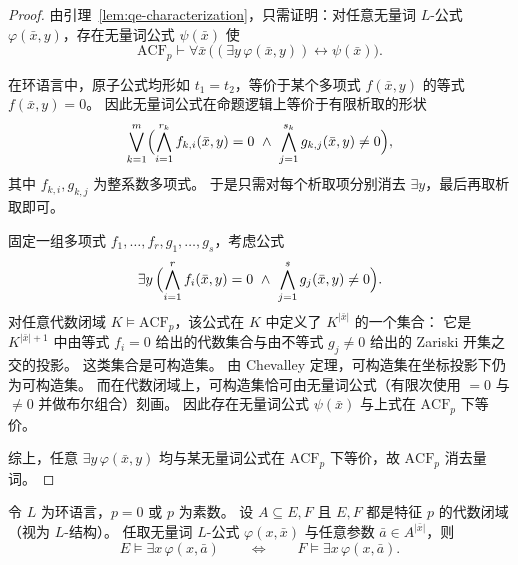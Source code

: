 \documentclass[lang=cn,a4paper,newtx,section]{elegantbook}
\begin{document}
\begin{proof}
由引理~\ref{lem:qe-characterization}，只需证明：对任意无量词 $L$-公式 $\varphi(\bar x,y)$，存在无量词公式 $\psi(\bar x)$ 使
\[
  \mathrm{ACF}_p\vdash\forall\bar x\,\bigl((\exists y\,\varphi(\bar x,y))\leftrightarrow\psi(\bar x)\bigr).
\]

在环语言中，原子公式均形如 $t_1=t_2$，等价于某个多项式 $f(\bar x,y)$ 的等式 $f(\bar x,y)=0$。
因此无量词公式在命题逻辑上等价于有限析取的形状
\[
  \bigvee_{k=1}^m\Bigl(\bigwedge_{i=1}^{r_k} f_{k,i}(\bar x,y)=0\ \wedge\ \bigwedge_{j=1}^{s_k} g_{k,j}(\bar x,y)\neq 0\Bigr),
\]
其中 $f_{k,i},g_{k,j}$ 为整系数多项式。
于是只需对每个析取项分别消去 $\exists y$，最后再取析取即可。

固定一组多项式 $f_1,\dots,f_r,g_1,\dots,g_s$，考虑公式
\[
  \exists y\,\Bigl(\bigwedge_{i=1}^{r} f_i(\bar x,y)=0\ \wedge\ \bigwedge_{j=1}^{s} g_j(\bar x,y)\neq 0\Bigr).
\]
对任意代数闭域 $K\models\mathrm{ACF}_p$，该公式在 $K$ 中定义了 $K^{\lvert\bar x\rvert}$ 的一个集合：
它是 $K^{\lvert\bar x\rvert+1}$ 中由等式 $f_i=0$ 给出的代数集合与由不等式 $g_j\neq 0$ 给出的 Zariski 开集之交的投影。
这类集合是可构造集。
由 Chevalley 定理，可构造集在坐标投影下仍为可构造集。
 而在代数闭域上，可构造集恰可由无量词公式（有限次使用 $=0$ 与 $\neq 0$ 并做布尔组合）刻画。
 因此存在无量词公式 $\psi(\bar x)$ 与上式在 $\mathrm{ACF}_p$ 下等价。
 
 综上，任意 $\exists y\,\varphi(\bar x,y)$ 均与某无量词公式在 $\mathrm{ACF}_p$ 下等价，故 $\mathrm{ACF}_p$ 消去量词。
\end{proof}

\begin{lemma}
\label{acf-exists-transfer}
令 $L$ 为环语言，$p=0$ 或 $p$ 为素数。
设 $A\subseteq E,F$ 且 $E,F$ 都是特征 $p$ 的代数闭域（视为 $L$-结构）。
任取无量词 $L$-公式 $\varphi(x,\bar x)$ 与任意参数 $\bar a\in A^{\lvert\bar x\rvert}$，则
\[
  E\models\exists x\,\varphi(x,\bar a)\qquad\Longleftrightarrow\qquad F\models\exists x\,\varphi(x,\bar a).
\]
\end{lemma}
\end{document}

